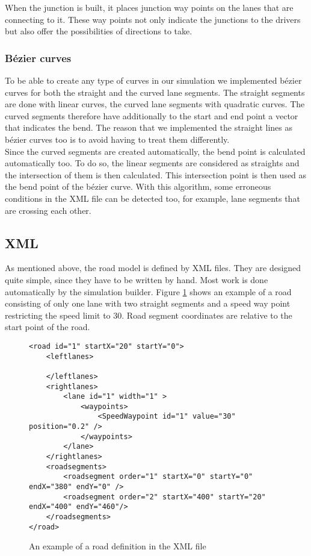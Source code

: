\noindent When the junction is built, it places junction way points on the
lanes that are connecting to it. These way points not only indicate the
junctions to the drivers but also offer the possibilities of directions
to take.

\subsubsection{Bézier curves}
\label{sec:bezier}

To be able to create any type of curves in our simulation we implemented
bézier curves for both the straight and the curved lane segments. The 
straight segments are done with linear curves, the curved lane segments
with quadratic curves. The curved segments therefore have additionally
to the start and end point a vector that indicates the bend. The reason
that we implemented the straight lines as bézier curves too is to avoid
having to treat them differently.  \\

\noindent Since the curved segments are created automatically, the bend
point is calculated automatically too. To do so, the linear segments are 
considered as straights and the intersection of them is then calculated.
This intersection point is then used as the bend point of the bézier curve.
With this algorithm, some erroneous conditions in the XML file can be
detected too, for example, lane segments that are crossing each other.

\subsection{XML}
\label{sec:XML}

As mentioned above, the road model is defined by XML files. They are 
designed quite simple, since they have to be written by hand. Most work
is done automatically by the simulation builder. Figure 
\ref{fig:xmlRoad} shows an example of a road consisting of only one 
lane with two straight segments and a speed way point restricting the
speed limit to 30. Road segment coordinates are relative to the start
point of the road. \\

\resetListing
\lstset{language=XML}
\begin{figure}[H]
\begin{lstlisting}
<road id="1" startX="20" startY="0">
	<leftlanes>

	</leftlanes>
	<rightlanes>
		<lane id="1" width="1" >
			<waypoints>
				<SpeedWaypoint id="1" value="30" position="0.2" />
			</waypoints>
		</lane>
	</rightlanes>
	<roadsegments>
		<roadsegment order="1" startX="0" startY="0" endX="380" endY="0" />
		<roadsegment order="2" startX="400" startY="20" endX="400" endY="460"/>
	</roadsegments>
</road>
\end{lstlisting}
\caption{An example of a road definition in the XML file}
\label{fig:xmlRoad}
\end{figure}

